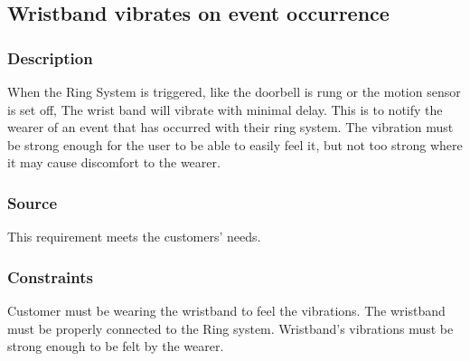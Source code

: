 \iffalse
\subsection{Requirement Name}
\subsubsection{Description}
Detailed requirement description...
\subsubsection{Source}
Source
\subsubsection{Constraints}
Detailed description of applicable constraints...
\subsubsection{Standards}
List of applicable standards
\subsubsection{Priority}
Priority
\fi
\subsection{Wristband vibrates on event occurrence}
\subsubsection{Description}
When the Ring System is triggered, like the doorbell is rung or the motion sensor is set off, The wrist band will vibrate with minimal delay. This is to notify the wearer of an event that has occurred with their ring system. The vibration must be strong enough for the user to be able to easily feel it, but not too strong where it may cause discomfort to the wearer.  
\subsubsection{Source}
This requirement meets the customers' needs.
\subsubsection{Constraints}
Customer must be wearing the wristband to feel the vibrations.
The wristband must be properly connected to the Ring system. Wristband's vibrations must be strong enough to be felt by the wearer.
